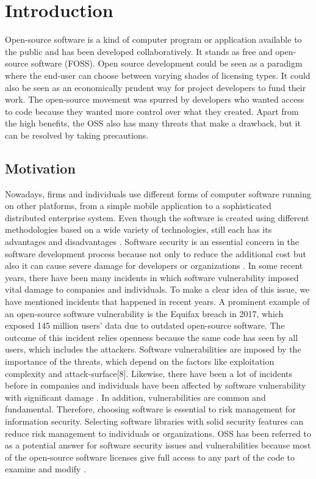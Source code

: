 %
\section{Introduction}\label{sec:introduction}
%
Open-source software is a kind of computer program or application available to the public and has been developed collaboratively. It stands as free and open-source software (FOSS).
Open source development could be seen as a paradigm where the end-user can choose between varying shades of licensing types. It could also be seen as an economically prudent way for project developers to fund their work. The open-source movement was spurred by developers who wanted access to code because they wanted more control over what they created. Apart from the high benefits, the OSS also has many threats that make a drawback, but it can be resolved by taking precautions.
\subsection{Motivation}
Nowadays, firms and individuals use different forms of computer software running on other platforms, from a simple mobile application to a sophisticated distributed enterprise system. Even though the software is created using different methodologies based on a wide variety of technologies, still each has its advantages and disadvantages \cite{tur38}\cite{KaDaPeTu2014}. Software security is an essential concern in the software development process because not only to reduce the additional cost but also it can cause severe damage for developers or organizations \cite{fil2}. In some recent years, there have been many incidents in which software vulnerability imposed vital damage to companies and individuals. To make a clear idea of this issue, we have mentioned incidents that happened in recent years. A prominent example of an open-source software vulnerability is the Equifax breach in 2017, which exposed 145 million users' data due to outdated open-source software. The outcome of this incident relies openness because the same code has seen by all users, which includes the attackers\cite{WinNT}. Software vulnerabilities are imposed by the importance of the threats, which depend on the factors like exploitation complexity and attack-surface[8]. Likewise, there have been a lot of incidents before in companies and individuals have been affected by software vulnerability with significant damage \cite{tur38}. In addition, vulnerabilities are common and fundamental. Therefore, choosing software is essential to risk management for information security. Selecting software libraries with solid security features can reduce risk management to individuals or organizations. \acs{OSS} has been referred to as a potential answer for software security issues and vulnerabilities because most of the open-source software licenses give full access to any part of the code to examine and modify \cite{KeJaSa2005}.

